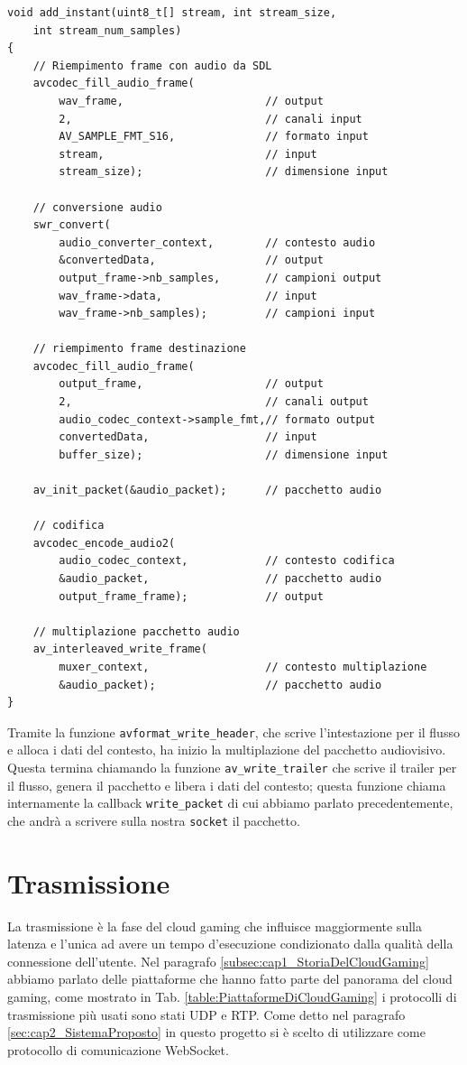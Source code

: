 \begin{lstlisting}[caption=Codice per la codifica audio. File: \detokenize{lib/util/encoding/encode_to_movie.hpp}, label={lst:audioCodecFFmpeg}]
void add_instant(uint8_t[] stream, int stream_size, 
	int stream_num_samples)
{
	// Riempimento frame con audio da SDL
	avcodec_fill_audio_frame(
		wav_frame,						// output
		2,								// canali input
		AV_SAMPLE_FMT_S16,				// formato input
		stream,							// input
		stream_size);					// dimensione input			

	// conversione audio
	swr_convert(
		audio_converter_context,		// contesto audio
		&convertedData,					// output
		output_frame->nb_samples,		// campioni output
		wav_frame->data,				// input
		wav_frame->nb_samples);			// campioni input

	// riempimento frame destinazione
	avcodec_fill_audio_frame(
		output_frame, 					// output
		2,								// canali output
		audio_codec_context->sample_fmt,// formato output
		convertedData,					// input
		buffer_size);					// dimensione input			
			
	av_init_packet(&audio_packet);		// pacchetto audio
	
	// codifica
	avcodec_encode_audio2(
		audio_codec_context,			// contesto codifica
		&audio_packet,					// pacchetto audio
		output_frame_frame);			// output			
	
	// multiplazione pacchetto audio
	av_interleaved_write_frame(
		muxer_context,					// contesto multiplazione
		&audio_packet);					// pacchetto audio
}
\end{lstlisting}

Tramite la funzione \verb|avformat_write_header|, che scrive l'intestazione per il flusso e alloca i dati del contesto, ha inizio la multiplazione del pacchetto audiovisivo. Questa termina chiamando la funzione \verb|av_write_trailer| che scrive il trailer per il flusso, genera il pacchetto e libera i dati del contesto; questa funzione chiama internamente la callback \verb|write_packet| di cui abbiamo parlato precedentemente, che andrà a scrivere sulla nostra \verb|socket| il pacchetto.


\section{Trasmissione}
La trasmissione è la fase del cloud gaming che influisce maggiormente sulla latenza e l'unica ad avere un tempo d'esecuzione condizionato dalla qualità della connessione dell'utente. Nel paragrafo \ref{subsec:cap1_StoriaDelCloudGaming} abbiamo parlato delle piattaforme che hanno fatto parte del panorama del cloud gaming, come mostrato in Tab. \ref{table:PiattaformeDiCloudGaming} i protocolli di trasmissione più usati sono stati UDP e RTP. Come detto nel paragrafo \ref{sec:cap2_SistemaProposto} in questo progetto si è scelto di utilizzare come protocollo di comunicazione WebSocket.


